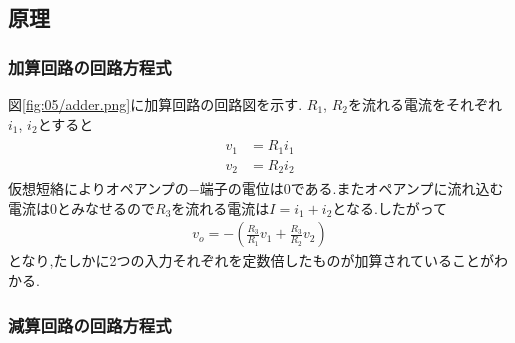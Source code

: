 \subsection{原理}
\subsubsection{加算回路の回路方程式}
図\ref{fig:05/adder.png}に加算回路の回路図を示す.
$R_1$, $R_2$を流れる電流をそれぞれ$i_1$, $i_2$とすると
\begin{align}
  \begin{split}
    v_1&=R_1i_1\\
    v_2&=R_2i_2
  \end{split}
\end{align}
仮想短絡によりオペアンプの$-$端子の電位は0である.またオペアンプに流れ込む電流は0とみなせるので$R_3$を流れる電流は$I=i_1+i_2$となる.したがって
\begin{align}
  v_o=-\left(\frac{R_3}{R_1}v_1+\frac{R_3}{R_2}v_2\right)
\end{align}
となり,たしかに2つの入力それぞれを定数倍したものが加算されていることがわかる.
\subsubsection{減算回路の回路方程式}